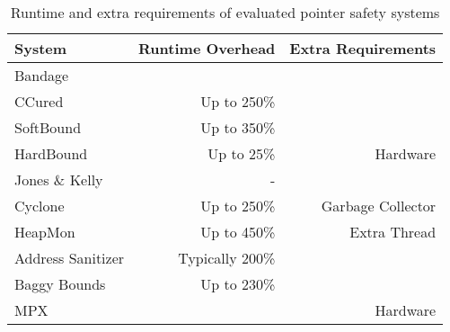 \begin{table}
\centering
\begin{tabular}{l|r|r}
System & Runtime Overhead & Extra Requirements \\
\hline
Bandage             &&\\
CCured              &Up to 250\%&\\
SoftBound           &Up to 350\%&\\
HardBound           &Up to 25\%&Hardware\\
Jones \& Kelly      &-&\\
Cyclone             &Up to 250\%&Garbage Collector\\
HeapMon             &Up to 450\%&Extra Thread\\
Address Sanitizer   &Typically 200\%&\\
Baggy Bounds        &Up to 230\%&\\
MPX                 &&Hardware\\
\end{tabular}
\caption{Runtime and extra requirements of evaluated pointer safety systems}
\label{fig:Others}
\end{table}

